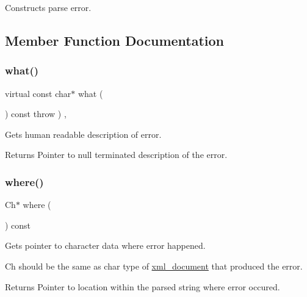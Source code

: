 Constructs parse error. 



\subsection{Member Function Documentation}
\mbox{\label{classrapidxml_1_1parse__error_ad62489809e3df568e973597b928d6d9b}} 
\subsubsection{\texorpdfstring{what()}{what()}}
{\footnotesize\ttfamily virtual const char$\ast$ what (\begin{DoxyParamCaption}{ }\end{DoxyParamCaption}) const throw  ) \hspace{0.3cm}{\ttfamily [inline]}, {\ttfamily [virtual]}}



Gets human readable description of error. 

\begin{DoxyReturn}{Returns}
Pointer to null terminated description of the error. 
\end{DoxyReturn}
\mbox{\label{classrapidxml_1_1parse__error_ad34b0f81cc71453b5b111e4afb557e1d}} 
\subsubsection{\texorpdfstring{where()}{where()}}
{\footnotesize\ttfamily Ch$\ast$ where (\begin{DoxyParamCaption}{ }\end{DoxyParamCaption}) const\hspace{0.3cm}{\ttfamily [inline]}}



Gets pointer to character data where error happened. 

Ch should be the same as char type of \mbox{\hyperlink{classrapidxml_1_1xml__document}{xml\+\_\+document}} that produced the error. \begin{DoxyReturn}{Returns}
Pointer to location within the parsed string where error occured. 
\end{DoxyReturn}
